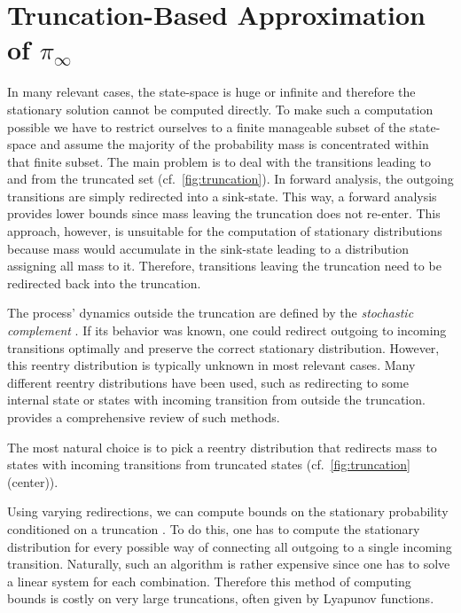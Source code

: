 \section{Truncation-Based Approximation of $\pi_{\infty}$}\label{sec:statagg:fsp}
In many relevant cases, the state-space is huge or infinite and therefore the stationary solution cannot be computed directly.
To make such a computation possible we have to restrict ourselves to a finite manageable subset of the state-space and assume the majority of the probability mass is concentrated within that finite subset.
The main problem is to deal with the transitions leading to and from the truncated set (cf.\ \autoref{fig:truncation}).
In forward analysis, the outgoing transitions are simply redirected into a sink-state.
This way, a forward analysis provides lower bounds since mass leaving the truncation does not re-enter.
This approach, however, is unsuitable for the computation of stationary distributions because mass would accumulate in the sink-state leading to a distribution assigning all mass to it.
Therefore, transitions leaving the truncation need to be redirected back into the truncation.

The process' dynamics outside the truncation are defined by the \emph{stochastic complement} \cite{spieler2014numerical}.
If its behavior was known, one could redirect outgoing to incoming transitions optimally and preserve the correct stationary distribution.
However, this reentry distribution is typically unknown in most relevant cases.
Many different reentry distributions have been used, such as redirecting to some internal state or states with incoming transition from outside the truncation.
\citet{kuntz2021approximations} provides a comprehensive review of such methods.

The most natural choice is to pick a reentry distribution that redirects mass to states with incoming transitions from truncated states (cf.\ \autoref{fig:truncation} (center)).

Using varying redirections, we can compute bounds on the stationary probability conditioned on a truncation \cite[(Thm. 14)]{spieler2014numerical}.
To do this, one has to compute the stationary distribution for every possible way of connecting all outgoing to a single incoming transition.
Naturally, such an algorithm is rather expensive since one has to solve a linear system for each combination.
Therefore this method of computing bounds is costly on very large truncations, often given by Lyapunov functions.

